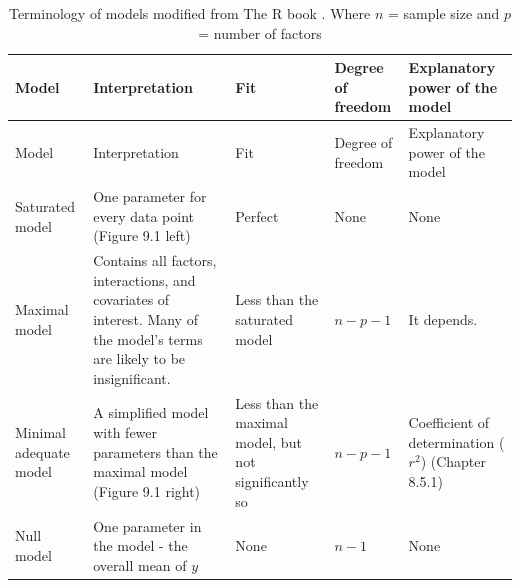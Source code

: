 \documentclass[
]{book}
\begin{document}
\begin{longtable}[]{@{}
  >{\raggedright\arraybackslash}p{}
  >{\raggedright\arraybackslash}p{}
  >{\raggedright\arraybackslash}p{}
  >{\raggedright\arraybackslash}p{}
  >{\raggedright\arraybackslash}p{}@{}}
\caption{\label{tab:model-term} Terminology of models modified from The R book \citep{crawleych9}.
Where \(n\) = sample size and \(p\) = number of factors}\tabularnewline
\toprule\noalign{}
\begin{minipage}[b]{\linewidth}\raggedright
Model
\end{minipage} & \begin{minipage}[b]{\linewidth}\raggedright
Interpretation
\end{minipage} & \begin{minipage}[b]{\linewidth}\raggedright
Fit
\end{minipage} & \begin{minipage}[b]{\linewidth}\raggedright
Degree of freedom
\end{minipage} & \begin{minipage}[b]{\linewidth}\raggedright
Explanatory power of the model
\end{minipage} \\
\midrule\noalign{}
\endfirsthead
\toprule\noalign{}
\begin{minipage}[b]{\linewidth}\raggedright
Model
\end{minipage} & \begin{minipage}[b]{\linewidth}\raggedright
Interpretation
\end{minipage} & \begin{minipage}[b]{\linewidth}\raggedright
Fit
\end{minipage} & \begin{minipage}[b]{\linewidth}\raggedright
Degree of freedom
\end{minipage} & \begin{minipage}[b]{\linewidth}\raggedright
Explanatory power of the model
\end{minipage} \\
\midrule\noalign{}
\endhead
\bottomrule\noalign{}
\endlastfoot
Saturated model & One parameter for every data point (Figure 9.1 left) & Perfect & None & None \\
Maximal model & Contains all factors, interactions, and covariates of interest. Many of the model's terms are likely to be insignificant. & Less than the saturated model & \(n - p - 1\) & It depends. \\
Minimal adequate model & A simplified model with fewer parameters than the maximal model (Figure 9.1 right) & Less than the maximal model, but not significantly so & \(n - p - 1\) & Coefficient of determination (\(r^2\)) (Chapter 8.5.1) \\
Null model & One parameter in the model - the overall mean of \(y\) & None & \(n - 1\) & None \\
\end{longtable}
\end{document}
